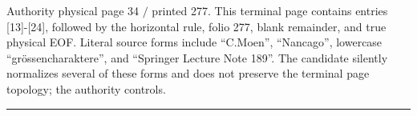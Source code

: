 \documentclass[10pt,a4paper]{article}
\begin{document}
\clearpage
{}
\label{d035-physical-034}
\par Authority physical page 34 $/$ printed 277. This terminal page contains entries [13]-[24], followed by the horizontal rule, folio 277, blank remainder, and true physical EOF. Literal source forms include ``C.Moen'', ``Nancago'', lowercase ``grössencharaktere'', and ``Springer Lecture Note 189''. The candidate silently normalizes several of these forms and does not preserve the terminal page topology; the authority controls.\par
\vfill\hrule\smallskip{}
\end{document}
